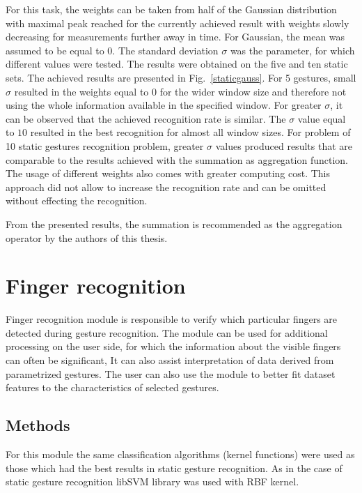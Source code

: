 For this task, the weights can be taken from half of the Gaussian distribution with maximal peak reached for the currently achieved result with weights slowly decreasing for measurements further away in time.
For Gaussian, the mean was assumed to be equal to $0$.
The standard deviation $\sigma$ was the parameter, for which different values were tested.
The results were obtained on the five and ten static sets.
The achieved results are presented in Fig.~\ref{staticgauss}.
For 5 gestures, small $\sigma$ resulted in the weights equal to $0$ for the wider window size and therefore not using the whole information available in the specified window. 
For greater $\sigma$, it can be observed that the achieved recognition rate is similar.
The $\sigma$ value equal to $10$ resulted in the best recognition for almost all window sizes.
For problem of 10 static gestures recognition problem, greater $\sigma$ values produced results that are comparable to the results achieved with the summation as aggregation function.
The usage of different weights also comes with greater computing cost.
This approach did not allow to increase the recognition rate and can be omitted without effecting the recognition.

From the presented results, the summation is recommended as the aggregation operator by the authors of this thesis.


\section{Finger recognition}\label{fingerSection}
Finger recognition module is responsible to verify which particular fingers are detected during gesture recognition. The module can be used for additional processing on the user side, for which the information about the visible fingers can often be significant, It can also assist interpretation of data derived from parametrized gestures. The user can also use the module to better fit dataset features to the characteristics of selected gestures.
\subsection{Methods}
For this module the same classification algorithms (kernel functions) were used as those which had the best results in static gesture recognition. As in the case of static gesture recognition libSVM library was used with RBF kernel.
